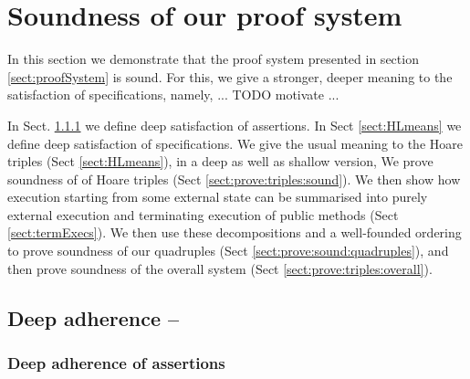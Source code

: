 \section{Soundness of our proof system}

In this section we demonstrate that the proof system presented in section \ref{sect:proofSystem} is sound. 
For this, we give a stronger, deeper meaning to the satisfaction of specifications, namely, ... TODO motivate ... 

In Sect.  \ref{s:deep:mean} we define deep satisfaction of assertions. 
In Sect \ref{sect:HLmeans} we define deep satisfaction of specifications.
We give the usual meaning to the Hoare triples (Sect \ref{sect:HLmeans}), in a deep as well as shallow version,
We prove soundness of of Hoare triples (Sect \ref{sect:prove:triples:sound}).
We then show how execution starting from some external state can be summarised into purely external execution and terminating execution of public methods (Sect \ref{sect:termExecs}). We then use these decompositions and a well-founded ordering to prove soundness of our quadruples  (Sect \ref{sect:prove:sound:quadruples}), and then prove soundness of the overall system  (Sect \ref{sect:prove:triples:overall}). 



\subsection{Deep adherence    -- } 

\subsubsection{Deep adherence of assertions}
\label{s:deep:mean}
  
